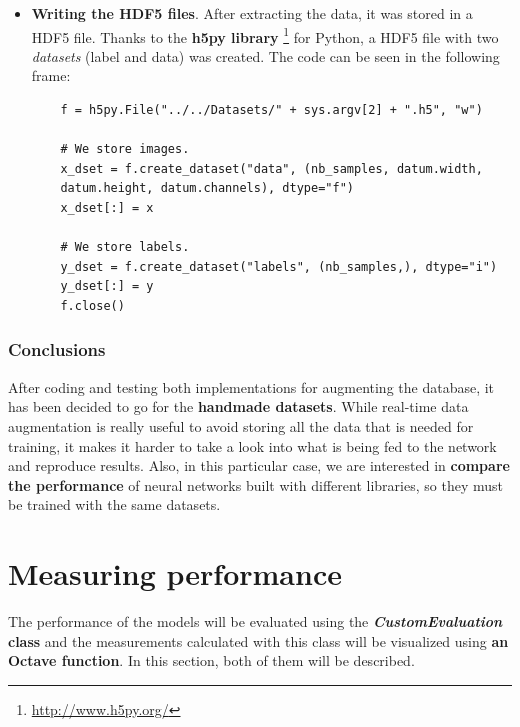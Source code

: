 \begin{itemize}
\begin{lstlisting}
		x.append(im)
		y.append(label)
		nb_samples += 1
		
		print("Extracted samples: " + str(nb_samples) + "\n")
		
		x = np.asarray(x)
		y = np.asarray(y)
	\end{lstlisting}
	
	\item \textbf{Writing the HDF5 files}. After extracting the data, it was stored in a HDF5 file. Thanks to the \textbf{h5py library} \footnote{\url{http://www.h5py.org/}} for Python, a HDF5 file with two \textit{datasets} (label and data) was created. The code can be seen in the following frame:	 
	\begin{lstlisting}
	f = h5py.File("../../Datasets/" + sys.argv[2] + ".h5", "w")
	
	# We store images.
	x_dset = f.create_dataset("data", (nb_samples, datum.width,
	datum.height, datum.channels), dtype="f")
	x_dset[:] = x
	
	# We store labels.
	y_dset = f.create_dataset("labels", (nb_samples,), dtype="i")
	y_dset[:] = y
	f.close()
	\end{lstlisting}
\end{itemize} 

\subsubsection{Conclusions}
After coding and testing both implementations for augmenting the database, it has been decided to go for the \textbf{handmade datasets}. While real-time data augmentation is really useful to avoid storing all the data that is needed for training, it makes it harder to take a look into what is being fed to the network and reproduce results. Also, in this particular case, we are interested in \textbf{compare the performance} of neural networks built with different libraries, so they must be trained with the same datasets.

\section{Measuring performance}\label{sec:measuring}
The performance of the models will be evaluated using the \textbf{\textit{CustomEvaluation} class} and the measurements calculated with this class will be visualized using \textbf{an Octave function}. In this section, both of them will be described.


